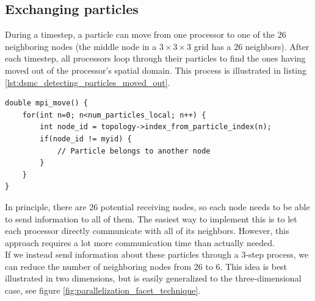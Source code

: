 \subsection{Exchanging particles}
\label{sec:dsmc_parallelization_exchange_particles}
During a timestep, a particle can move from one processor to one of the 26 neighboring nodes (the middle node in a $3\times3\times3$ grid has a 26 neighbors). After each timestep, all processors loop through their particles to find the ones having moved out of the processor's spatial domain. This process is illustrated in listing \ref{lst:dsmc_detecting_particles_moved_out}.
\begin{lstlisting}[caption=Detecting which particles moved out of a processor's spatial domain., label=lst:dsmc_detecting_particles_moved_out]
double mpi_move() {
	for(int n=0; n<num_particles_local; n++) {
		int node_id = topology->index_from_particle_index(n);
		if(node_id != myid) {
			// Particle belongs to another node
		}
	}
}
\end{lstlisting}
In principle, there are 26 potential receiving nodes, so each node needs to be able to send information to all of them. The easiest way to implement this is to let each processor directly communicate with all of its neighbors. However, this approach requires a lot more communication time than actually needed.\\
If we instead send information about these particles through a 3-step process, we can reduce the number of neighboring nodes from 26 to 6. This idea is best illustrated in two dimensions, but is easily generalized to the three-dimensional case, see figure \ref{fig:parallelization_facet_technique}.
